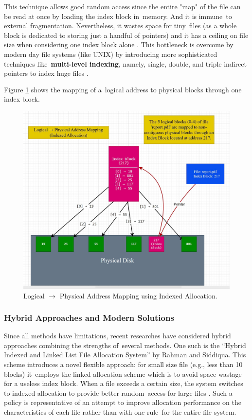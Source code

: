 \documentclass[12pt]{article}
\begin{document}
This technique allows good random access since the entire "map" of the file can be read at once by loading the index block in memory. And it is immune to external fragmentation. Nevertheless, it wastes space for tiny files (as a whole block is dedicated to storing just a handful of pointers) and it has a ceiling on file size when considering one index block alone \parencite{IRJMETS2021}. This bottleneck is overcome by modern day file systems (like UNIX) by introducing more sophisticated techniques like \textbf{multi-level indexing}, namely, single, double, and triple indirect pointers to index huge files \parencite{Tanenbaum2014}.

Figure \ref{fig:indexed_allocation_diagram} shows the mapping of a logical address to physical blocks through one index block. 

\begin{figure}[H]
    \centering
    \includegraphics[width=\textwidth]{image/diagram mapping Indexed Allocation.jpg}
    \caption{Logical $\rightarrow$ Physical Address Mapping using Indexed Allocation.}
    \label{fig:indexed_allocation_diagram}
\end{figure}

\subsubsection{Hybrid Approaches and Modern Solutions}
Since all methods have limitations, recent researches have considered hybrid approaches combining the strengths of several methods. One such is the “Hybrid Indexed and Linked List File Allocation System” by Rahman and Siddiqua. This scheme introduces a novel flexible approach: for small size file (e.g., less than 10 blocks) it employs the linked allocation scheme which is to avoid space wastage for a useless index block. When a file exceeds a certain size, the system switches to indexed allocation to provide better random access for large files \parencite{IRJMETS2021}. Such a policy is representative of an attempt to improve allocation performance on the characteristics of each file rather than with one rule for the entire file system. 
\end{document}
